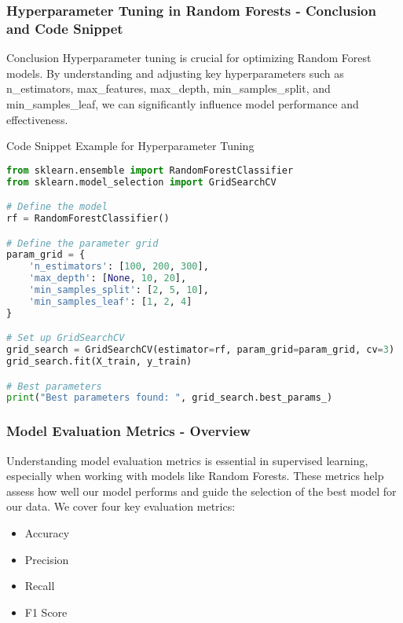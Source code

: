 \documentclass[aspectratio=169]{beamer}
\begin{document}
\begin{frame}[fragile]
    \frametitle{Hyperparameter Tuning in Random Forests - Conclusion and Code Snippet}
    \begin{block}{Conclusion}
        Hyperparameter tuning is crucial for optimizing Random Forest models. By understanding and adjusting key hyperparameters such as n\_estimators, max\_features, max\_depth, min\_samples\_split, and min\_samples\_leaf, we can significantly influence model performance and effectiveness.
    \end{block}

    \begin{block}{Code Snippet Example for Hyperparameter Tuning}
        \begin{lstlisting}[language=Python]
from sklearn.ensemble import RandomForestClassifier
from sklearn.model_selection import GridSearchCV

# Define the model
rf = RandomForestClassifier()

# Define the parameter grid
param_grid = {
    'n_estimators': [100, 200, 300],
    'max_depth': [None, 10, 20],
    'min_samples_split': [2, 5, 10],
    'min_samples_leaf': [1, 2, 4]
}

# Set up GridSearchCV
grid_search = GridSearchCV(estimator=rf, param_grid=param_grid, cv=3)
grid_search.fit(X_train, y_train)

# Best parameters
print("Best parameters found: ", grid_search.best_params_)
        \end{lstlisting}
    \end{block}
\end{frame}

\begin{frame}[fragile]
    \frametitle{Model Evaluation Metrics - Overview}
    Understanding model evaluation metrics is essential in supervised learning, especially when working with models like Random Forests.
    These metrics help assess how well our model performs and guide the selection of the best model for our data. We cover four key evaluation metrics:
    \begin{itemize}
        \item Accuracy
        \item Precision
        \item Recall
        \item F1 Score
    \end{itemize}
\end{frame}
\end{document}
